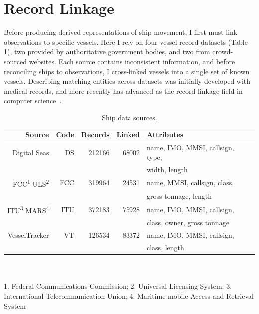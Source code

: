 
\section{Record Linkage}

Before producing derived representations of ship movement, I first must link observations to specific vessels. Here I rely on four vessel record datasets (Table \ref{table:ships-data-sources}), two provided by authoritative government bodies, and two from crowd-sourced websites. Each source contains inconsistent information, and before reconciling ships to observations, I cross-linked vessels into a single set of known vessels. Describing matching entities across datasets was initially developed with medical records, and more recently has advanced as the record linkage field in computer science~\citep{Christen2012}.

\begin{table}
  \caption[Ship data sources]{Ship data sources.}
  \tabcolsep=0.11cm
  \renewcommand{\arraystretch}{0.65}
  \begin{tabular}{rrrrl}
    \hline
    Source & Code & Records & Linked & Attributes \\
    \hline
     Digital Seas & DS & 212166 & 68002 & name, IMO, MMSI, callsign, type, \\
                  &    &        &       &  width, length \\
      FCC\textsuperscript{1} ULS\textsuperscript{2} & FCC & 319964 & 24531 & name, MMSI, callsign, class,\\ 
                                                    &     &        &       & gross tonnage, length \\
      ITU\textsuperscript{3} MARS\textsuperscript{4} & ITU & 372183 & 75928 & name, IMO, MMSI, callsign, \\ 
                                                     &     &        &       & class, owner, gross tonnage \\ 
     VesselTracker & VT & 126534 & 83372 & name, IMO, MMSI, callsign,\\
                   &    &        &       & class, length
  \end{tabular}
  \\
  \\
  \footnotesize{1. Federal Communications Commission; 2. Universal Licensing System;  3. International Telecommunication Union; 4. Maritime mobile Access and Retrieval System}
  \label{table:ships-data-sources}
\end{table}

